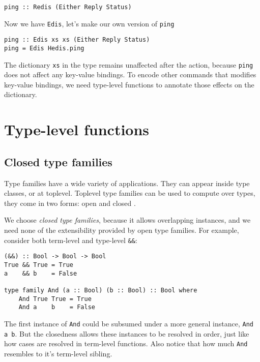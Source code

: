 \documentclass[pldi]{sigplanconf-pldi16}
\begin{document}
\begin{verbatim}
ping :: Redis (Either Reply Status)
\end{verbatim}

Now we have \texttt{Edis}, let's make our own version of
\texttt{ping}\footnotemark


\begin{verbatim}
ping :: Edis xs xs (Either Reply Status)
ping = Edis Hedis.ping
\end{verbatim}

The dictionary \texttt{xs} in the type remains unaffected after the
 action, because \texttt{ping} does not affect any key-value
 bindings. To encode other commands that modifies key-value bindings, we need
 type-level functions to annotate those effects on the dictionary.

\section{Type-level functions}
\subsection{Closed type families}

Type families have a wide variety of applications. They can appear inside type
 classes\cite{tfclass}\cite{tfsynonym}, or at toplevel. Toplevel type families
 can be used to compute over types, they come in two forms: open\cite{tfopen}
 and closed \cite{tfclosed}.

We choose \emph{closed type families}, because it allows overlapping instances,
 and we need none of the extensibility provided by open type families.
For example, consider both term-level and type-level \texttt{&&}:

\begin{verbatim}
(&&) :: Bool -> Bool -> Bool
True && True = True
a    && b    = False

type family And (a :: Bool) (b :: Bool) :: Bool where
    And True True = True
    And a    b    = False
\end{verbatim}

The first instance of \texttt{And} could be subsumed under a more
 general instance, \texttt{And a b}.
But the closedness allows these instances to be resolved in order, just like
 how cases are resolved in term-level functions. Also notice that how much
 \texttt{And} resembles to it's term-level sibling.
\end{document}
